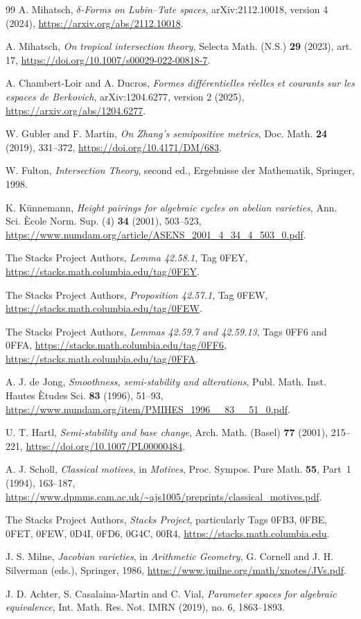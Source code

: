 \documentclass[11pt,reqno]{amsart}
\theoremstyle{definition}
\theoremstyle{remark}
\numberwithin{equation}{section}
\begin{document}
\begin{thebibliography}{99}
A. Mihatsch, \emph{$\delta$-Forms on Lubin--Tate spaces},
arXiv:2112.10018, version 4 (2024),
\url{https://arxiv.org/abs/2112.10018}.

A. Mihatsch, \emph{On tropical intersection theory},
Selecta Math. (N.S.) \textbf{29} (2023), art. 17,
\url{https://doi.org/10.1007/s00029-022-00818-7}.

A. Chambert-Loir and A. Ducros,
\emph{Formes diff\'erentielles r\'eelles et courants sur les espaces
de Berkovich}, arXiv:1204.6277, version 2 (2025),
\url{https://arxiv.org/abs/1204.6277}.

W. Gubler and F. Martin, \emph{On Zhang's semipositive metrics},
Doc. Math. \textbf{24} (2019), 331--372,
\url{https://doi.org/10.4171/DM/683}.

W. Fulton, \emph{Intersection Theory}, second ed.,
Ergebnisse der Mathematik, Springer, 1998.

K. K\"unnemann, \emph{Height pairings for algebraic cycles on
abelian varieties}, Ann. Sci. \`Ecole Norm. Sup. (4)
\textbf{34} (2001), 503--523,
\url{https://www.numdam.org/article/ASENS_2001_4_34_4_503_0.pdf}.

The Stacks Project Authors, \emph{Lemma 42.58.1}, Tag 0FEY,
\url{https://stacks.math.columbia.edu/tag/0FEY}.

The Stacks Project Authors, \emph{Proposition 42.57.1}, Tag 0FEW,
\url{https://stacks.math.columbia.edu/tag/0FEW}.

The Stacks Project Authors, \emph{Lemmas 42.59.7 and 42.59.13},
Tags 0FF6 and 0FFA,
\url{https://stacks.math.columbia.edu/tag/0FF6},
\url{https://stacks.math.columbia.edu/tag/0FFA}.

A. J. de Jong, \emph{Smoothness, semi-stability and alterations},
Publ. Math. Inst. Hautes \`Etudes Sci. \textbf{83} (1996), 51--93,
\url{https://www.numdam.org/item/PMIHES_1996__83__51_0.pdf}.

U. T. Hartl, \emph{Semi-stability and base change},
Arch. Math. (Basel) \textbf{77} (2001), 215--221,
\url{https://doi.org/10.1007/PL00000484}.

A. J. Scholl, \emph{Classical motives}, in \emph{Motives},
Proc. Sympos. Pure Math. \textbf{55}, Part~1 (1994), 163--187,
\url{https://www.dpmms.cam.ac.uk/~ajs1005/preprints/classical_motives.pdf}.

The Stacks Project Authors, \emph{Stacks Project},
particularly Tags 0FB3, 0FBE, 0FET, 0FEW, 0D4I, 0FD6, 0G4C, 00R4,
\url{https://stacks.math.columbia.edu}.

J. S. Milne, \emph{Jacobian varieties}, in \emph{Arithmetic Geometry},
G. Cornell and J. H. Silverman (eds.), Springer, 1986,
\url{https://www.jmilne.org/math/xnotes/JVs.pdf}.

J. D. Achter, S. Casalaina-Martin and C. Vial,
\emph{Parameter spaces for algebraic equivalence},
Int. Math. Res. Not. IMRN (2019), no. 6, 1863--1893.
\end{thebibliography}
\end{document}
